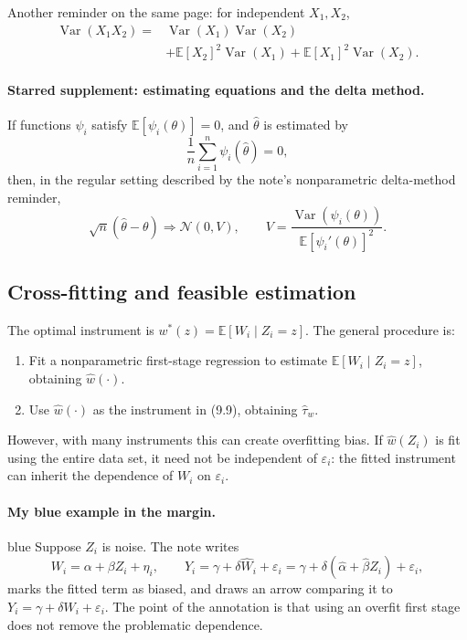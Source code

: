 Another reminder on the same page: for independent $X_1,X_2$,
\begin{align*}
 \operatorname{Var}(X_1X_2)
 ={}&\operatorname{Var}(X_1)\operatorname{Var}(X_2)\\
 &+\mathbb E[X_2]^2\operatorname{Var}(X_1)
 +\mathbb E[X_1]^2\operatorname{Var}(X_2).
\end{align*}

\paragraph{Starred supplement: estimating equations and the delta method.}
If functions $\psi_i$ satisfy $\mathbb E[\psi_i(\theta)]=0$, and $\widehat\theta$ is estimated by
\[
 \frac1n\sum_{i=1}^n\psi_i(\widehat\theta)=0,
\]
then, in the regular setting described by the note's nonparametric delta-method reminder,
\[
 \sqrt n(\widehat\theta-\theta)\Rightarrow\mathcal N(0,V),
 \qquad
 V=\frac{\operatorname{Var}(\psi_i(\theta))}
 {\mathbb E[\psi_i'(\theta)]^2}.
\]

\subsection{Cross-fitting and feasible estimation}
The optimal instrument is $w^*(z)=\mathbb E[W_i\mid Z_i=z]$. The general procedure is:
\begin{enumerate}
 \item Fit a nonparametric first-stage regression to estimate $\mathbb E[W_i\mid Z_i=z]$, obtaining $\widehat w(\cdot)$.
 \item Use $\widehat w(\cdot)$ as the instrument in (9.9), obtaining $\widehat\tau_w$.
\end{enumerate}
However, with many instruments this can create overfitting bias. If $\widehat w(Z_i)$ is fit using the entire data set, it need not be independent of $\varepsilon_i$: the fitted instrument can inherit the dependence of $W_i$ on $\varepsilon_i$.

\paragraph{My blue example in the margin.}
\begin{inkblock}{blue}
Suppose $Z_i$ is noise. The note writes
\[
 W_i=\alpha+\beta Z_i+\eta_i,
 \qquad Y_i=\gamma+\delta\widehat W_i+\varepsilon_i
 =\gamma+\delta(\widehat\alpha+\widehat\beta Z_i)+\varepsilon_i,
\]
marks the fitted term as biased, and draws an arrow comparing it to $Y_i=\gamma+\delta W_i+\varepsilon_i$.
 The point of the annotation is that using an overfit first stage does not remove the problematic dependence.
\end{inkblock}

